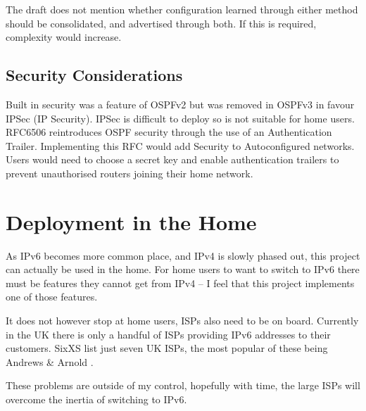 \documentclass[12pt,a4paper,twoside]{report}
\begin{document}
The draft does not mention whether configuration learned through either method
should be consolidated, and advertised through both. If this is required,
complexity would increase.

\subsection{Security Considerations} 
Built in security was a feature of OSPFv2 but was removed in OSPFv3 in favour
IPSec (IP Security). IPSec is difficult to deploy so is not suitable for home
users. RFC6506 reintroduces OSPF security through the use of an Authentication
Trailer\cite{rfc6506}. Implementing this RFC would add Security to
Autoconfigured networks. Users would need to choose a secret key and enable
authentication trailers to prevent unauthorised routers joining their home
network.  

\section{Deployment in the Home}
As IPv6 becomes more common place, and IPv4 is slowly phased out, this project can 
actually be used in the home. For home users to want to switch to IPv6 there must 
be features they cannot get from IPv4 -- I feel that this project 
implements one of those features.

It does not however stop at home users, ISPs also need to be on board.
Currently in the UK there is only a handful of ISPs providing IPv6 addresses to
their customers. SixXS list just seven UK ISPs, the most popular of these being
Andrews \& Arnold \cite{SixXS}.

These problems are outside of my control, hopefully with time, the
large ISPs will overcome the inertia of switching to IPv6.

\raggedbottom
\pagebreak

\printnomenclature
{}
\raggedbottom
\pagebreak

{}
{}



\end{document}
